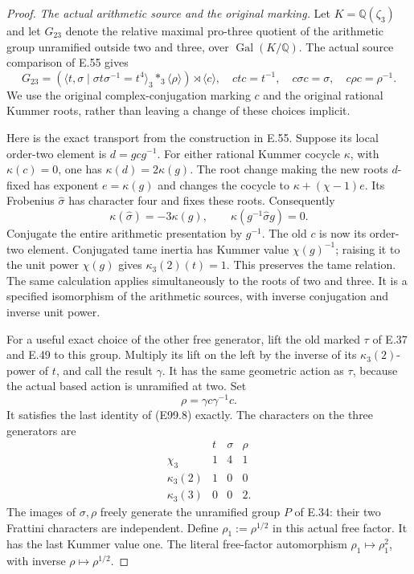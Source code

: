 \begin{proof}
\emph{The actual arithmetic source and the original marking.}
Let $K=\mathbb Q(\zeta_3)$ and let $G_{23}$ denote the
relative maximal pro-three quotient of the arithmetic group
unramified outside two and three, over
$\operatorname{Gal}(K/\mathbb Q)$.
The actual source comparison of E.55 gives
\[
 G_{23}=\left(
       \langle t,\sigma\mid\sigma t\sigma^{-1}=t^4\rangle_3
                   \mathop{\ast}_3\langle\rho\rangle
          \right)\rtimes\langle c\rangle,
 \quad
 ctc=t^{-1},\quad c\sigma c=\sigma,
 \quad c\rho c=\rho^{-1}.                                 \tag{E99.8}
\]
We use the original complex-conjugation marking $c$ and
the original rational Kummer roots, rather than leaving a
change of these choices implicit.

Here is the exact transport from the construction in E.55.
Suppose its local order-two element is $d=g c g^{-1}$.
For either rational Kummer cocycle $\kappa$, with
$\kappa(c)=0$, one has $\kappa(d)=2\kappa(g)$.
The root change making the new roots $d$-fixed has exponent
$e=\kappa(g)$ and changes the cocycle to
$\kappa+(\chi-1)e$.
Its Frobenius $\widehat\sigma$ has character four and
fixes these roots. Consequently
\[
 \kappa(\widehat\sigma)=-3\kappa(g),\qquad
 \kappa(g^{-1}\widehat\sigma g)=0.
 \tag{E99.9}
\]
Conjugate the entire arithmetic presentation by $g^{-1}$.
The old $c$ is now its order-two element. Conjugated tame
inertia has Kummer value $\chi(g)^{-1}$; raising it to the
unit power $\chi(g)$ gives $\kappa_3(2)(t)=1$.
This preserves the tame relation. The same calculation
applies simultaneously to the roots of two and three.
It is a specified isomorphism of the arithmetic sources,
with inverse conjugation and inverse unit power.

For a useful exact choice of the other free generator,
lift the old marked $\tau$ of E.37 and E.49 to this group.
Multiply its lift on the left by the inverse of its
$\kappa_3(2)$-power of $t$, and call the result $\gamma$.
It has the same geometric action as $\tau$, because
the actual based action is unramified at two. Set
\[
                   \rho=\gamma c\gamma^{-1}c.
 \tag{E99.10}
\]
It satisfies the last identity of (E99.8) exactly. The
characters on the three generators are
\[
 \begin{array}{c|ccc}
             &t&\sigma&\rho\\\hline
 \chi_3      &1&4&1\\
 \kappa_3(2)&1&0&0\\
 \kappa_3(3)&0&0&2.
 \end{array}                                               \tag{E99.11}
\]
The images of $\sigma,\rho$ freely generate the unramified
group $P$ of E.34: their two Frattini characters are
independent. Define $\rho_1:=\rho^{1/2}$ in this actual free factor.
It has the last Kummer value one. The literal free-factor
automorphism $\rho_1\mapsto\rho_1^2$, with inverse
$\rho\mapsto\rho^{1/2}$.


\end{proof}
